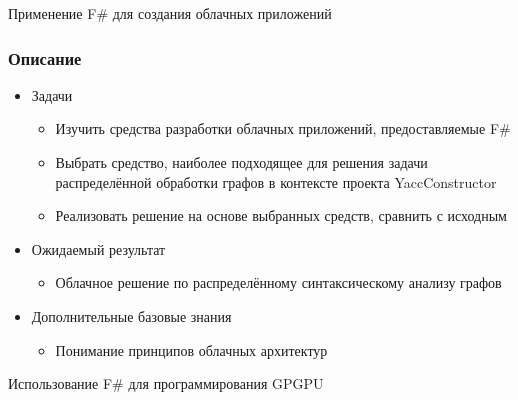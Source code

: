 \documentclass{beamer}
\begin{document}
\begin{frame}[plain,c]
 \transwipe[direction=90]
 \begin{center}
  \Huge Применение F\# для создания облачных приложений
 \end{center}
\end{frame}

\begin{frame}[fragile]
\transwipe[direction=90]
\frametitle{Описание}
\begin{itemize}
\item Задачи
\begin{itemize}
  \item Изучить средства разработки облачных приложений, предоставляемые F\#
  \item Выбрать средство, наиболее подходящее для решения задачи распределённой обработки графов в контексте проекта YaccConstructor
  \item Реализовать решение на основе выбранных средств, сравнить с исходным
\end{itemize}
\item Ожидаемый результат
\begin{itemize}
\item Облачное решение по распределённому синтаксическому анализу графов
\end{itemize}
\item Дополнительные базовые знания
\begin{itemize}
\item Понимание принципов облачных архитектур
\end{itemize}
\end{itemize}
\end{frame}

\begin{frame}[plain,c]
 \transwipe[direction=90]
 \begin{center}
  \Huge Использование F\# для программирования GPGPU
 \end{center}
\end{frame}
\end{document}
